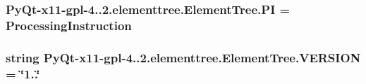 \subsubsection[{P\+I}]{\setlength{\rightskip}{0pt plus 5cm}Py\+Qt-\/x11-\/gpl-\/4..\+2.elementtree.\+Element\+Tree.\+P\+I = {\bf Processing\+Instruction}}\label{namespacePyQt-x11-gpl-4_811_82_1_1elementtree_1_1ElementTree_a25e3990c1d4227261b76d8d4861d1193}
\hypertarget{namespacePyQt-x11-gpl-4_811_82_1_1elementtree_1_1ElementTree_afe7ce87e065a19e640fb9f1b94b4aff3}{}
\subsubsection[{V\+E\+R\+S\+I\+O\+N}]{\setlength{\rightskip}{0pt plus 5cm}string Py\+Qt-\/x11-\/gpl-\/4..\+2.elementtree.\+Element\+Tree.\+V\+E\+R\+S\+I\+O\+N = \char`\"{}1..\char`\"{}}\label{namespacePyQt-x11-gpl-4_811_82_1_1elementtree_1_1ElementTree_afe7ce87e065a19e640fb9f1b94b4aff3}
